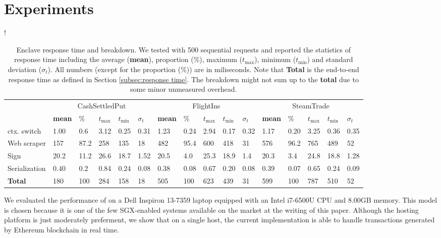\section{Experiments}
\label{sec:experiments}

\begin{table*}[h]
\resizebox{\linewidth} {!}{
\begin{tabular}{l|lllll|lllll|lllll}
\toprule
& \multicolumn{5}{c|}{\sf CashSettledPut} &
  \multicolumn{5}{c|}{\sf FlightIns} &
  \multicolumn{5}{c}{\sf SteamTrade} \\
    & \textbf{mean} & \% & $t_{\max}$ & $t_{\min}$ & $\sigma_t$ & \textbf{mean}
    & \% & $t_{\max}$ & $t_{\min}$ & $\sigma_t$ & \textbf{mean} & \% & $t_{\max}$
    & $t_{\min}$ & $\sigma_t$\\
\midrule
    ctx. switch & 1.00 & 0.6 & 3.12 & 0.25 & 0.31 
                & 1.23 & 0.24 & 2.94 & 0.17 & 0.32 
                & 1.17 & 0.20 & 3.25 & 0.36 & 0.35\\
    Web scraper & 157  & 87.2 & 258 & 135 & 18 
                & 482  & 95.4 & 600 & 418 & 31 
                & 576  & 96.2 & 765 & 489 & 52\\
    Sign        & 20.2 & 11.2 & 26.6 & 18.7 & 1.52 
                & 20.5 & 4.0 & 25.3 & 18.9 & 1.4 
                & 20.3 & 3.4 & 24.8 & 18.8 & 1.28\\
    Serialization 
                & 0.40 & 0.2 & 0.84 & 0.24 & 0.08 
                & 0.38 & 0.08 & 0.67 & 0.20 & 0.08 
                & 0.39 & 0.07 & 0.65 & 0.24 & 0.09\\
\midrule
\midrule
    \textbf{Total} 
                & 180 & 100 & 284 & 158 & 18 
                & 505 & 100 & 623 & 439 & 31 
                & 599 & 100 & 787 & 510 & 52 \\
\bottomrule	
\end{tabular}
}
\caption{Enclave response time and breakdown. 
We tested \tc with 500 sequential requests and reported
the statistics of response time including 
the average ({\bf mean}), proportion (\%), maximum ($t_{\max}$),
minimum ($t_{\min}$) and standard deviation ($\sigma_t$).
All numbers (except for the proportion (\%)) are in miliseconds.
Note that {\bf Total} is the end-to-end response time as 
defined in Section \ref{subsec:response time}. The breakdown
might not sum up to the {\bf total} due to
some minor unmeasured overhead.}
\label{tab:eval_profiling}
\end{table*}

We evaluated the performance of \tc on a Dell Inspiron 13-7359 laptop equipped
with an Intel i7-6500U CPU and 8.00GB memory.  This model is chosen 
because it is one of the few SGX-enabled systems available on the market at the
writing of this paper. Although the hosting platform is just moderately preferment, we
show that on a single host, the current implementation is able to handle 
transactions generated by Ethereum blockchain in real time. 


